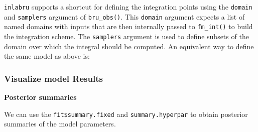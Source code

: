 \documentclass[
  letterpaper,
  DIV=11,
  numbers=noendperiod]{scrartcl}
\newenvironment{Shaded}{\begin{snugshade}}{\end{snugshade}}
\newcommand{\AttributeTok}[1]{\textcolor[rgb]{0.40,0.45,0.13}{#1}}
\newcommand{\DecValTok}[1]{\textcolor[rgb]{0.68,0.00,0.00}{#1}}
\newcommand{\FunctionTok}[1]{\textcolor[rgb]{0.28,0.35,0.67}{#1}}
\newcommand{\NormalTok}[1]{\textcolor[rgb]{0.00,0.23,0.31}{#1}}
\newcommand{\OtherTok}[1]{\textcolor[rgb]{0.00,0.23,0.31}{#1}}
\newcommand{\SpecialCharTok}[1]{\textcolor[rgb]{0.37,0.37,0.37}{#1}}
\newcommand{\StringTok}[1]{\textcolor[rgb]{0.13,0.47,0.30}{#1}}
\begin{document}
\begin{tcolorbox}[enhanced jigsaw, coltitle=black, breakable, opacityback=0, colbacktitle=quarto-callout-note-color!10!white, leftrule=.75mm, opacitybacktitle=0.6, title=\textcolor{quarto-callout-note-color}{\faInfo}\hspace{0.5em}{Note}, titlerule=0mm, toptitle=1mm, bottomtitle=1mm, left=2mm, colback=white, arc=.35mm, colframe=quarto-callout-note-color-frame, rightrule=.15mm, bottomrule=.15mm, toprule=.15mm]

\texttt{inlabru} supports a shortcut for defining the integration points
using the \texttt{domain} and \texttt{samplers} argument of
\texttt{bru\_obs()}. This \texttt{domain} argument expects a list of
named domains with inputs that are then internally passed to
\texttt{fm\_int()} to build the integration scheme. The
\texttt{samplers} argument is used to define subsets of the domain over
which the integral should be computed. An equivalent way to define the
same model as above is:

\begin{Shaded}
\end{Shaded}

\end{tcolorbox}

\subsubsection{Visualize model Results}\label{visualize-model-results}

\textbf{Posterior summaries}

We can use the \texttt{fit\$summary.fixed} and \texttt{summary.hyperpar}
to obtain posterior summaries of the model parameters.
\end{document}
